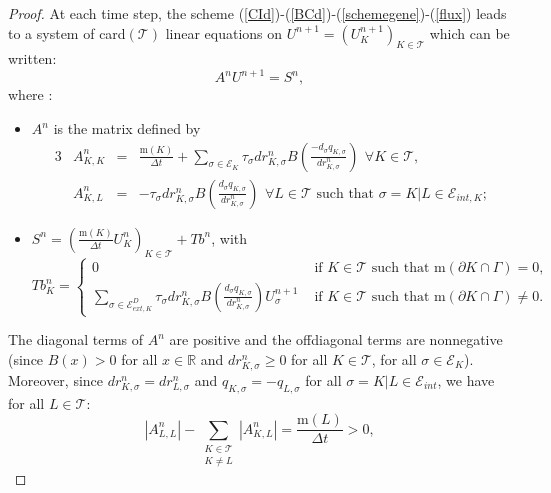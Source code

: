 \documentclass[smallextended]{svjour3}
\newcommand{\ds}{\displaystyle}
\def\pa{\partial}
\def\pa{\partial}
\begin{document}
\begin{proof}
At each time step, the scheme (\ref{CId})-(\ref{BCd})-(\ref{schemegene})-(\ref{flux}) leads to a system of card$(\mathcal{T})$ linear equations on $U^{n+1}=(U^{n+1}_{K})_{K \in \mathcal{T}}$ which can be written:
\begin{equation*}
A^{n}U^{n+1}=S^{n},
\end{equation*}
where :
\begin{itemize}
\item[$\bullet$] $A^{n}$ is the matrix defined by
\begin{alignat*}{3}
&A^{n}_{K,K} & = &  \frac{\text{m}(K)}{\Delta t}+\sum_{\sigma \in \mathcal{E}_{K}}\tau_{\sigma}dr^{n}_{K,\sigma}B\left(\frac{-d_{\sigma}q_{K,\sigma}}{dr^{n}_{K,\sigma}}\right) \,\ \forall K \in \mathcal{T},\\
&A^{n}_{K,L} & = & -\tau_{\sigma}dr^{n}_{K,\sigma}B\left(\frac{d_{\sigma}q_{K,\sigma}}{dr^{n}_{K,\sigma}}\right) \,\ \forall L \in \mathcal{T} \text{ such that } \sigma=K|L \in \mathcal{E}_{int,K};
\end{alignat*}
\item[$\bullet$] $\ds{S^{n}=\left(\frac{\text{m}(K)}{\Delta t}U^{n}_{K}\right)_{K \in \mathcal{T}}+Tb^{n}}$, with
\begin{equation*}
Tb^{n}_{K} = \left\{\begin{array}{ll} 0  & \text{ if } K \in \mathcal{T} \text{ such that } \text{m}(\pa K\cap \Gamma)=0,\\ \ds{\sum_{\sigma \in \mathcal{E}_{ext,K}^{D}}\tau_{\sigma}dr^{n}_{K,\sigma}B\left(\ds{\frac{d_{\sigma}q_{K,\sigma}}{dr^{n}_{K,\sigma}}}\right)U^{n+1}_{\sigma}}  & \text{ if } K \in \mathcal{T} \text{ such that } \text{m}(\pa K\cap \Gamma)\neq 0. \end{array}\right.
\end{equation*}
\end{itemize}
The diagonal terms of $A^{n}$ are positive and the offdiagonal terms are nonnegative (since $B(x)>0$ for all $x \in \mathbb{R}$ and $dr^{n}_{K,\sigma} \geq 0$ for all $K \in \mathcal{T}$, for all $\sigma \in \mathcal{E}_{K}$). Moreover, since $dr^{n}_{K,\sigma}=dr_{L,\sigma}^{n}$ and $q_{K,\sigma}=-q_{L,\sigma}$ for all $ \sigma=K|L \in \mathcal{E}_{int}$, we have for all $L \in \mathcal{T}$:
\begin{equation*}
\left|A^{n}_{L,L}\right|-\sum_{\substack{K \in \mathcal{T} \\ K \neq L}}\left|A^{n}_{K,L}\right|=\frac{\text{m}(L)}{\Delta t}>0,
\end{equation*}

\end{proof}
\end{document}
